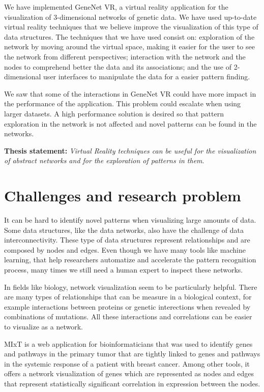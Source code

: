 We have implemented GeneNet VR, a virtual reality application for the visualization of 3-dimensional networks of genetic data. We have used up-to-date virtual reality techniques that we believe improve the visualization of this type of data structures. The techniques that we have used consist on: exploration of the network by moving around the virtual space, making it easier for the user to see the network from different perspectives; interaction with the network and the nodes to comprehend better the data and its associations; and the use of 2-dimensional user interfaces to manipulate the data for a easier pattern finding.

We saw that some of the interactions in GeneNet VR could have more impact in the performance of the application. This problem could escalate when using larger datasets. A high performance solution is desired so that pattern exploration in the network is not affected and novel patterns can be found in the networks.

\textbf{Thesis statement: } \emph{Virtual Reality techniques can be useful for the visualization of abstract networks and for the exploration of patterns in them}.

\section{Challenges and research problem}
It can be hard to identify novel patterns when visualizing large amounts of data. Some data structures, like the data networks, also have the challenge of data interconnectivity. These type of data structures represent relationships and are composed by nodes and edges. Even though we have many tools like machine learning, that help researchers automatize and accelerate the pattern recognition process, many times we still need a human expert to inspect these networks\cite{network_expert}.

In fields like biology, network visualization seem to be particularly helpful\cite{pujana_network_modeling}\cite{fraser_view_function}. There are many types of relationships that can be measure in a biological context, for example interactions between proteins or genetic interections when revealed by combinations of mutations. All these interactions and correlations can be easier to visualize as a network\cite{merico_visualization}.

MIxT\cite{fjukstad_dumeaux_olsen_lund_hallett_bongo_2017} is a web application for bioinformaticians that was used to identify genes and pathways in the primary tumor that are tightly linked to genes and pathways in the systemic response of a patient with breast cancer\cite{dumeaux_fjukstad_interactions_tumor_blood}. Among other tools, it offers a network visualization of genes which are represented as nodes and edges that represent statistically significant correlation in expression between the nodes.

